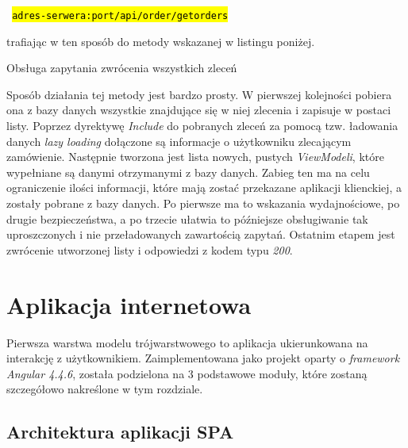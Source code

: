 \vspace{2mm}

    \centerline{\texttt{\hl{ adres-serwera:port/api/order/getorders }}}

\vspace{2mm}

\noindent trafiając w ten sposób do metody wskazanej w listingu poniżej.

\begin{listing}[ht]
    \caption{Obsługa zapytania zwrócenia wszystkich zleceń}
    \label{listing:getorders-server}
\end{listing}

\noindent Sposób działania tej metody jest bardzo prosty. W pierwszej kolejności pobiera ona z bazy danych wszystkie znajdujące się w niej zlecenia i zapisuje w postaci listy. Poprzez dyrektywę \textit{Include} do pobranych zleceń za pomocą tzw. ładowania danych \textit{lazy loading} dołączone są informacje o użytkowniku zlecającym zamówienie. Następnie tworzona jest lista nowych, pustych \textit{ViewModeli}, które wypełniane są danymi otrzymanymi z bazy danych. Zabieg ten ma na celu ograniczenie ilości informacji,  które mają zostać przekazane aplikacji klienckiej, a zostały pobrane z bazy danych. Po pierwsze ma to wskazania wydajnościowe, po drugie bezpieczeństwa, a po trzecie ułatwia to późniejsze obsługiwanie tak uproszczonych i nie przeładowanych zawartością zapytań. Ostatnim etapem jest zwrócenie utworzonej listy i odpowiedzi z kodem typu \textit{200}.


\section{Aplikacja internetowa}
\quad Pierwsza warstwa modelu trójwarstwowego to aplikacja ukierunkowana na interakcję z użytkownikiem. Zaimplementowana jako projekt oparty o \textit{framework} \textit{Angular 4.4.6}, została podzielona na 3 podstawowe moduły, które zostaną szczegółowo nakreślone w tym rozdziale.
\newpage

\vspace*{0.01\baselineskip}

\subsection{Architektura aplikacji SPA}

